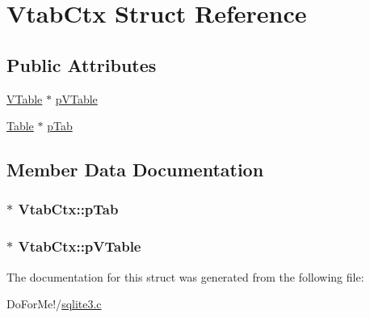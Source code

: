 \hypertarget{struct_vtab_ctx}{\section{Vtab\-Ctx Struct Reference}
\label{struct_vtab_ctx}
}
\subsection*{Public Attributes}
\begin{DoxyCompactItemize}
\item 
\hyperlink{struct_v_table}{V\-Table} $\ast$ \hyperlink{struct_vtab_ctx_a99bbe533ea0423138d7dddba5aa662b8}{p\-V\-Table}
\item 
\hyperlink{struct_table}{Table} $\ast$ \hyperlink{struct_vtab_ctx_a4040cb18a83afebad0ad7e7f20572b09}{p\-Tab}
\end{DoxyCompactItemize}


\subsection{Member Data Documentation}
\hypertarget{struct_vtab_ctx_a4040cb18a83afebad0ad7e7f20572b09}{
\subsubsection[{p\-Tab}]{$\ast$ Vtab\-Ctx\-::p\-Tab}}\label{struct_vtab_ctx_a4040cb18a83afebad0ad7e7f20572b09}
\hypertarget{struct_vtab_ctx_a99bbe533ea0423138d7dddba5aa662b8}{
\subsubsection[{p\-V\-Table}]{$\ast$ Vtab\-Ctx\-::p\-V\-Table}}\label{struct_vtab_ctx_a99bbe533ea0423138d7dddba5aa662b8}


The documentation for this struct was generated from the following file\-:\begin{DoxyCompactItemize}
\item 
Do\-For\-Me!/\hyperlink{sqlite3_8c}{sqlite3.\-c}\end{DoxyCompactItemize}
